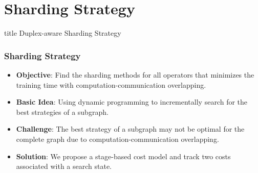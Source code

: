 \documentclass[12pt,aspectratio=169]{beamer}
\begin{document}
    \section*{Sharding Strategy}

    \begin{frame}
        \centering
        \begin{beamercolorbox}[sep=8pt,center,shadow=true,rounded=true]{title}
          Duplex-aware Sharding Strategy\par%
        \end{beamercolorbox}
    \end{frame}


    \begin{frame}
        \frametitle{Sharding Strategy}

        \begin{itemize}
            \setlength{\itemsep}{.8em}
            \item \textbf{Objective}: Find the sharding methods for all operators that minimizes the training time with computation-communication overlapping.
            \item \textbf{Basic Idea}: Using dynamic programming to incrementally search for the best strategies of a subgraph.
            \item \textbf{Challenge}: The best strategy of a subgraph may not be optimal for the complete graph due to computation-communication overlapping.
            \item \textbf{Solution}: We propose a stage-based cost model and track two costs associated with a search state.
        \end{itemize}
    \end{frame}
\end{document}
